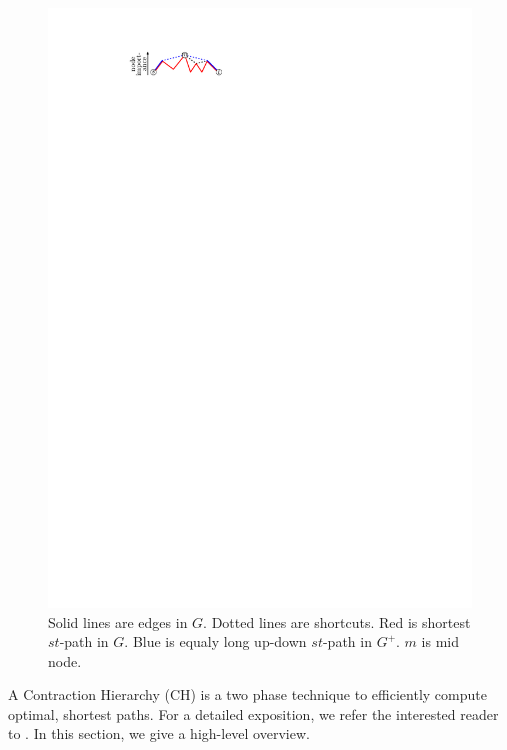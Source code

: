 \documentclass[letterpaper]{article} %
\begin{document}
\begin{figure}
\centering
\includegraphics{fig/ch}
\caption{
Solid lines are edges in $G$. Dotted lines are shortcuts. Red is shortest $st$-path in $G$. Blue is equaly long up-down $st$-path in $G^+$. $m$ is mid node.
}
\label{fig:ch}
\end{figure}

A Contraction Hierarchy (CH) is a two phase technique to efficiently compute optimal, shortest paths.
For a detailed exposition, we refer the interested reader to \cite{gssv-erlrn-12,dsw-cch-15}.
In this section, we give a high-level overview.
\end{document}

